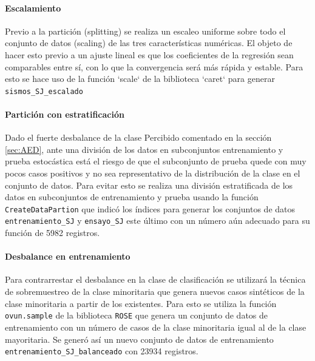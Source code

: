 \documentclass[a4paper]{report}
\begin{document}
\paragraph{Escalamiento}
Previo a la partición (splitting) se realiza un escaleo uniforme sobre todo el conjunto de datos (scaling) de las tres características numéricas. 
El objeto de hacer esto previo a un ajuste lineal es que los coeficientes de la regresión sean comparables entre sí, con lo que la convergencia será más rápida y estable.
Para esto se hace uso de la función `scale` de la biblioteca `caret` para generar \verb'sismos_SJ_escalado' 


\paragraph{Partición con estratificación}
Dado el fuerte desbalance de la clase Percibido comentado en la sección \ref{sec:AED}, ante una división de los datos en subconjuntos entrenamiento y prueba estocástica está el riesgo de que el subconjunto de prueba quede con muy pocos casos positivos y no sea representativo de la distribución de la clase en el conjunto de datos. 
Para evitar esto se realiza una división estratificada de los datos en subconjuntos de entrenamiento y prueba usando la función \verb'CreateDataPartion' que indicó los índices para generar los conjuntos de datos \verb'entrenamiento_SJ' y \verb'ensayo_SJ' este último con un número aún adecuado para su función de \num{5982} registros.


\paragraph{Desbalance en entrenamiento}
Para contrarrestar el desbalance en la clase de clasificación se utilizará la técnica de sobremuestreo de la clase minoritaria que genera nuevos casos sintéticos de la clase minoritaria a partir de los existentes.
Para esto se utiliza la función \verb'ovun.sample' de la biblioteca \verb'ROSE' que genera un conjunto de datos de entrenamiento con un número de casos de la clase minoritaria igual al de la clase mayoritaria.
Se generó así un nuevo conjunto de datos de entrenamiento \verb'entrenamiento_SJ_balanceado' con \num{23934} registros.






\end{document}
